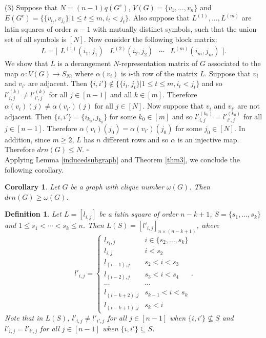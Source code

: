 \documentclass[11pt,letterpaper]{article}
\newtheorem{corollary}[theorem]{Corollary}
\newtheorem{definition}[theorem]{Definition}
\begin{document}
{%
(3) Suppose that $N=(n-1)q(G^c)$, $V(G)=\{v_1,\ldots,v_n\}$ and
$E(G^c)=\{\{v_{i_t},v_{j_t}\}| 1\leq t\leq m, i_t<j_t\}$. Also suppose that $L^{(1)},\ldots,L^{(m)}$ are latin squares of order $n-1$  with mutually distinct symbols, such that the union set of all symbols is $[N]$. Now consider the following block matrix:
\[L=\bigg[\begin{array}{c|c|c|c}
   L^{(1)}(i_1,j_1) & L^{(2)}(i_2,j_2)&\cdots & L^{(m)}(i_m,j_m)
   \end{array}\bigg].\]
   We show that $L$ is a derangement $N$-representation matrix of $G$ associated to the map $\alpha:V(G)\rightarrow S_N$, where $\alpha(v_i)$ is $i$-th row of the matrix $L$. Suppose that $v_i$ and $v_{i'}$ are adjacent. Then $\{i,i'\}\notin\{\{i_t,j_t\}| 1\leq t\leq m, i_t<j_t\}$ and so $l'^{(k)}_{i,j}\neq l'^{(k)}_{i',j}$ for all $j\in[n-1]$ and all $k\in [m]$. Therefore $\alpha(v_i)(j)\neq \alpha(v_{i'})(j)$ for all $j\in [N]$. Now suppose that $v_i$ and $v_{i'}$ are not adjacent. Then $\{i,i'\}=\{i_{k_0},j_{k_0}\}$ for some $k_0\in [m]$ and so $l'^{(k_0)}_{i,j}= l'^{(k_0)}_{i',j}$ for all $j\in[n-1]$. Therefore $\alpha(v_i)(j_0)=\alpha(v_{i'})(j_0)$ for some $j_0\in [N]$. In addition, since $m\geq2$, $L$ has $n$ different rows and so $\alpha$ is an injective map. Therefore $drn(G)\leq N$. 
				\hfill $\square$\\
Applying Lemma \ref{inducedsubgraph} and Theorem \ref{thm3}, we conclude the following corollary.
\begin{corollary}
Let $G$ be a graph with clique number $\omega(G)$. Then $drn(G)\geq \omega(G)$.
\end{corollary}
\begin{definition}
Let $L=[l_{i,j}]$ be a latin square of order $n-k+1$, $S=\{s_1,\ldots,s_k\}$ and $1\leq s_1<\cdots<s_k\leq n$. Then $L(S)=[l'_{i,j}]_{n\times (n-k+1)}$, where
\[l'_{i,j}=\begin{cases}
l_{s_1,j} & i\in\{s_2,\ldots,s_k\}\\l_{i,j}&i<s_2 \\ l_{(i-1),j}&s_2<i<s_3\\
 l_{(i-2),j}&s_3<i<s_4\\ \cdots&\cdots \\l_{(i-k+2),j}&s_{k-1}<i<s_{k}\\l_{(i-k+1),j}&s_{k}<i
\end{cases}.\]
Note that in $L(S)$, $l'_{i,j}\neq l'_{i',j}$ for all $j\in[n-1]$ when $\{i,i'\}\nsubseteq S$ and $l'_{i,j}= l'_{i',j}$ for all $j\in[n-1]$ when $\{i,i'\}\subseteq S$.

\end{definition}}
\end{document}
